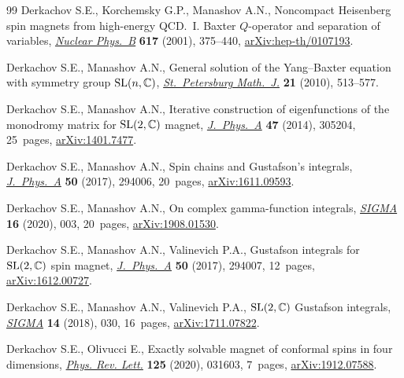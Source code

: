\begin{thebibliography}{99}
Derkachov S.E., Korchemsky G.P., Manashov A.N., Noncompact {H}eisenberg spin
 magnets from high-energy {QCD}.~{I}. {B}axter {$Q$}-operator and separation
 of variables,
 \href{https://doi.org/10.1016/S0550-3213(01)00457-6}{\textit{Nuclear
 Phys.~B}} \textbf{617} (2001), 375--440,
 \href{http://arxiv.org/abs/hep-th/0107193}{arXiv:hep-th/0107193}.

Derkachov S.E., Manashov A.N., General solution of the {Y}ang--{B}axter
 equation with symmetry group {${\rm SL}(n,\mathbb{C})$},
 \href{https://doi.org/10.1090/S1061-0022-2010-01106-3}{\textit{St.~Petersburg
 Math.~J.}} \textbf{21} (2010), 513--577.

Derkachov S.E., Manashov A.N., Iterative construction of eigenfunctions of the
 monodromy matrix for {${\rm SL}(2,\mathbb{C})$} magnet,
 \href{https://doi.org/10.1088/1751-8113/47/30/305204}{\textit{J.~Phys.~A}}
 \textbf{47} (2014), 305204, 25~pages,
 \href{http://arxiv.org/abs/1401.7477}{arXiv:1401.7477}.

Derkachov S.E., Manashov A.N., Spin chains and {G}ustafson's integrals,
 \href{https://doi.org/10.1088/1751-8121/aa749a}{\textit{J.~Phys.~A}}
 \textbf{50} (2017), 294006, 20~pages,
 \href{http://arxiv.org/abs/1611.09593}{arXiv:1611.09593}.

Derkachov S.E., Manashov A.N.,
On complex gamma-function integrals,
\href{https://doi.org/10.3842/SIGMA.2020.003}{\textit{SIGMA}} \textbf{16} (2020), 003, 20~pages,
\href{http://arxiv.org/abs/1908.01530}{arXiv:1908.01530}.


Derkachov S.E., Manashov A.N., Valinevich P.A., Gustafson integrals for {${\rm
 SL}(2,\mathbb{C})$} spin magnet,
 \href{https://doi.org/10.1088/1751-8121/aa7480}{\textit{J.~Phys.~A}}
 \textbf{50} (2017), 294007, 12~pages,
 \href{http://arxiv.org/abs/1612.00727}{arXiv:1612.00727}.

Derkachov S.E., Manashov A.N., Valinevich P.A., {${\rm SL}(2,\mathbb{C})$}
 {G}ustafson integrals,
 \href{https://doi.org/10.3842/SIGMA.2018.030}{\textit{SIGMA}} \textbf{14}
 (2018), 030, 16~pages,
 \href{http://arxiv.org/abs/1711.07822}{arXiv:1711.07822}.

Derkachov S.E., Olivucci E., Exactly solvable magnet of conformal spins in four
 dimensions,
 \href{https://doi.org/10.1103/physrevlett.125.031603}{\textit{Phys. Rev.
 Lett.}} \textbf{125} (2020), 031603, 7~pages,
 \href{http://arxiv.org/abs/1912.07588}{arXiv:1912.07588}.


\end{thebibliography}
